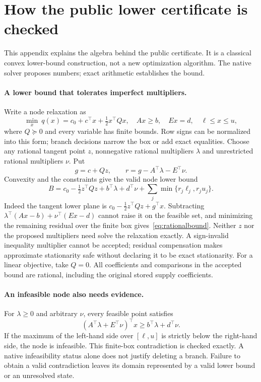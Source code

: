 \section{How the public lower certificate is checked}\label{app:certificates}
This appendix explains the algebra behind the public certificate. It is a
classical convex lower-bound construction, not a new optimization algorithm.
The native solver proposes numbers; exact arithmetic establishes the bound.

\paragraph{A lower bound that tolerates imperfect multipliers.}
Write a node relaxation as
\[
 \min_x\ q(x)=c_0+c^\top x+\tfrac12x^\top Qx,
 \quad Ax\ge b,\quad Ex=d,\quad \ell\le x\le u,
\]
where $Q\succeq0$ and every variable has finite bounds. Row signs can be
normalized into this form; branch decisions narrow the box or add exact
equalities. Choose any rational tangent point $z$, nonnegative rational
multipliers $\lambda$ and unrestricted rational multipliers $\nu$. Put
\[
 g=c+Qz,\qquad r=g-A^\top\lambda-E^\top\nu.
\]
Convexity and the constraints give the valid node lower bound
\begin{equation}\label{eq:rationalbound}
 B=c_0-\tfrac12 z^\top Qz+b^\top\lambda+d^\top\nu
       +\sum_j\min\{r_j\ell_j,r_j u_j\}.
\end{equation}
Indeed the tangent lower plane is
$c_0-\tfrac12z^\top Qz+g^\top x$. Subtracting
$\lambda^\top(Ax-b)+\nu^\top(Ex-d)$ cannot raise it on the
feasible set, and minimizing the remaining residual over the finite box
gives~\eqref{eq:rationalbound}. Neither $z$ nor the proposed multipliers
need solve the relaxation exactly. A sign-invalid inequality multiplier
cannot be accepted; residual compensation makes approximate stationarity
safe without declaring it to be exact stationarity. For a linear objective,
take $Q=0$. All coefficients and comparisons in the accepted bound are
rational, including the original stored supply coefficients.

\paragraph{An infeasible node also needs evidence.}
For $\lambda\ge0$ and arbitrary $\nu$, every feasible point satisfies
\[
 (A^\top\lambda+E^\top\nu)^\top x
       \ge b^\top\lambda+d^\top\nu.
\]
If the maximum of the left-hand side over $[\ell,u]$ is strictly below
the right-hand side, the node is infeasible. This finite-box contradiction
is checked exactly. A native infeasibility status alone does not justify
deleting a branch. Failure to obtain a valid contradiction leaves its
domain represented by a valid lower bound or an unresolved state.

